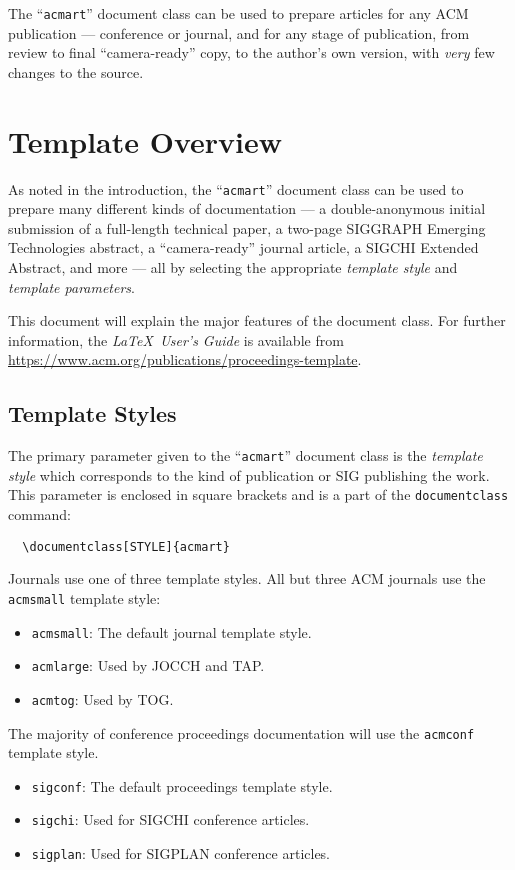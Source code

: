 \documentclass[acmsmall,natbib=false]{acmart}
\begin{document}
The ``\verb|acmart|'' document class can be used to prepare articles
for any ACM publication --- conference or journal, and for any stage
of publication, from review to final ``camera-ready'' copy, to the
author's own version, with {\itshape very} few changes to the source.

\section{Template Overview}
As noted in the introduction, the ``\verb|acmart|'' document class can
be used to prepare many different kinds of documentation --- a
double-anonymous initial submission of a full-length technical paper, a
two-page SIGGRAPH Emerging Technologies abstract, a ``camera-ready''
journal article, a SIGCHI Extended Abstract, and more --- all by
selecting the appropriate {\itshape template style} and {\itshape
        template parameters}.

This document will explain the major features of the document
class. For further information, the {\itshape \LaTeX\ User's Guide} is
available from
\url{https://www.acm.org/publications/proceedings-template}.

\subsection{Template Styles}

The primary parameter given to the ``\verb|acmart|'' document class is
the {\itshape template style} which corresponds to the kind of publication
or SIG publishing the work. This parameter is enclosed in square
brackets and is a part of the {\verb|documentclass|} command:
\begin{verbatim}
  \documentclass[STYLE]{acmart}
\end{verbatim}

Journals use one of three template styles. All but three ACM journals
use the {\verb|acmsmall|} template style:
\begin{itemize}
    \item {\texttt{acmsmall}}: The default journal template style.
    \item {\texttt{acmlarge}}: Used by JOCCH and TAP.
    \item {\texttt{acmtog}}: Used by TOG.
\end{itemize}

The majority of conference proceedings documentation will use the {\verb|acmconf|} template style.
\begin{itemize}
    \item {\texttt{sigconf}}: The default proceedings template style.
    \item{\texttt{sigchi}}: Used for SIGCHI conference articles.
    \item{\texttt{sigplan}}: Used for SIGPLAN conference articles.
\end{itemize}
\end{document}
